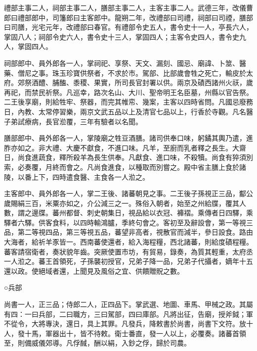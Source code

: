 \begin{pinyinscope}
 禮部主事二人，祠部主事二人，膳部主事二人，主客主事二人。武德三年，改儀曹郎曰禮部郎中，司籓郎曰主客郎中。龍朔二年，改禮部曰司禮，祠部曰司禋，膳部曰司膳，光宅元年，改禮部曰春官。有禮部令史五人，書令史十一人，亭長六人，掌固八人；祠部令史六人，書令史十三人，掌固四人；主客令史四人，書令史九人，掌固四人。



 祠部郎中、員外郎各一人，掌祠祀、享祭、天文、漏刻、國忌、廟諱、卜筮、醫藥、僧尼之事。珠玉珍寶供祭者，不求於市。駕部、比部歲會牲之死亡，輸皮於太府。郊祭酒醴、脯醢、黍稷、果實，所司長官封署以供。兩京及磧西諸州火祆，歲再祀，而禁民祈祭。凡巡幸，路次名山、大川、聖帝明王名臣墓，州縣以官告祭。二王後享廟，則給牲牢、祭器，而完其帷帟、幾案，主客以四時省問。凡國忌廢務日，內教、太常停習樂，兩京文武五品以上及清官七品以上，行香於寺觀。凡名醫子弟試療病，長官涖覆，三年有驗者以名聞。



 膳部郎中、員外郎各一人，掌陵廟之牲豆酒膳。諸司供奉口味，躬鐍其輿乃遣，進胙亦如之。非大禮、大慶不獻食，不進口味。凡羊，至廚而乳者釋之長生。大齋日，尚食進蔬食，釋所殺羊為長生供奉。凡獻食、進口味，不殺犢。尚食有猝須別索，必奏覆，月終而會之。凡尚食進食，以種取而別嘗之。殿中省主膳上食於諸陵，以番上下，四時遣食醫、主食各一人涖之。



 主客郎中、員外郎各一人，掌二王後、諸蕃朝見之事。二王後子孫視正三品，酅公歲賜絹三百，米粟亦如之，介公減三之一。殊俗入朝者，始至之州給牒，覆其人數，謂之邊牒。蕃州都督、刺史朝集日，視品給以衣冠、褲褶。乘傳者日四驛，乘驛者六驛。供客食料，以四時輸鴻臚，季終句會之。客初至及辭設會，第一等視三品，第二等視四品，第三等視五品，蕃望非高者，視散官而減半，參日設食。路由大海者，給祈羊豕皆一。西南蕃使還者，給入海程糧，西北諸蕃，則給度磧程糧。蕃客請宿衛者，奏狀貌年齒。突厥使置市坊，有貿易，錄奏，為質其輕重，太府丞一人涖之。蕃王首領死，子孫襲初授官，兄弟子降一品，兄弟子代攝者，嫡年十五還以政。使絕域者還，上聞見及風俗之宜、供饋贈貺之數。



 ○兵部



 尚書一人，正三品；侍郎二人，正四品下。掌武選、地圖、車馬、甲械之政。其屬有四：一曰兵部，二曰職方，三曰駕部，四曰庫部。凡將出征，告廟，授斧鉞；軍不從令，大將專決，還日，具上其罪。凡發兵，降敕書於尚書，尚書下文符。放十人，發十馬，軍器出十，皆不待敕。衛士番直，發一人以上，必覆奏。諸蕃首領至，則備威儀郊導。凡俘馘，酬以絹，入鈔之俘，歸於司農。




\end{pinyinscope}
